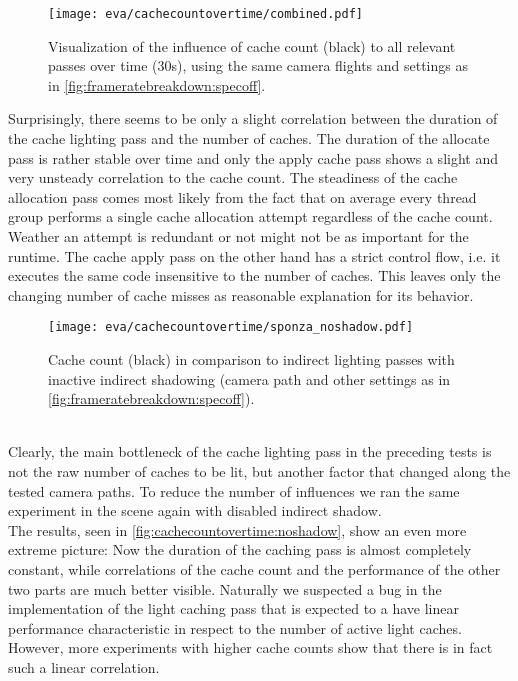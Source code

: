 \documentclass[thesis.tex]{subfiles}
\begin{document}
\begin{figure}
\centering
\texttt{[image: eva/cachecountovertime/combined.pdf]}
\caption{Visualization of the influence of cache count (black) to all relevant passes over time (30s), using the same camera flights and settings as in \autoref{fig:frameratebreakdown:specoff}.}
\label{fig:cachecountovertime}
\end{figure}
Surprisingly, there seems to be only a slight correlation between the duration of the cache lighting pass and the number of caches.
The duration of the allocate pass is rather stable over time and only the apply cache pass shows a slight and very unsteady correlation to the cache count.
The steadiness of the cache allocation pass comes most likely from the fact that on average every thread group performs a single cache allocation attempt regardless of the cache count.
Weather an attempt is redundant or not might not be as important for the runtime.
The cache apply pass on the other hand has a strict control flow, i.e. it executes the same code insensitive to the number of caches.
This leaves only the changing number of cache misses as reasonable explanation for its behavior.
\\
\begin{figure}[h]
\centering
\texttt{[image: eva/cachecountovertime/sponza\_noshadow.pdf]}
\caption{Cache count (black) in comparison to indirect lighting passes with inactive indirect shadowing (camera path and other settings as in \autoref{fig:frameratebreakdown:specoff}).}
\label{fig:cachecountovertime:noshadow}
\end{figure}
\\
Clearly, the main bottleneck of the cache lighting pass in the preceding tests is not the raw number of caches to be lit, but another factor that changed along the tested camera paths.
To reduce the number of influences we ran the same experiment in the  scene again with disabled indirect shadow.
\\
The results, seen in \autoref{fig:cachecountovertime:noshadow}, show an even more extreme picture:
Now the duration of the caching pass is almost completely constant, while correlations of the cache count and the performance of the other two parts are much better visible.
Naturally we suspected a bug in the implementation of the light caching pass that is expected to a have linear performance characteristic in respect to the number of active light caches.
However, more experiments with higher cache counts show that there is in fact such a linear correlation.
\end{document}
